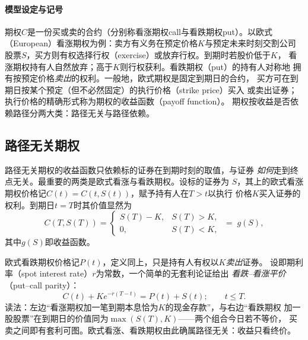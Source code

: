 \paragraph{模型设定与记号}
期权$C$是一份买或卖的合约（分别称看涨期权call与看跌期权put）。以欧式
（European）看涨期权为例：卖方有义务在预定价格$K$与预定未来时刻交割公司
股票$S$，买方则有权选择行权（exercise）或放弃行权。到期时若股价低于$K$，
看涨期权持有人自然放弃；高于$K$则行权获利。看跌期权（put）的持有人对称地
拥有按预定价格\emph{卖出}的权利。一般地，欧式期权是固定到期日的合约，
买方可在到期日按某个预定（但不必然固定）的执行价格（strike price）买入
或卖出证券；执行价格的精确形式称为期权的收益函数（payoff function）。
期权按收益是否依赖路径分两大类：路径无关与路径依赖。

\subsection{路径无关期权}

路径无关期权的收益函数只依赖标的证券在到期时刻的取值，与证券
\emph{如何}走到终点无关。最重要的两类是欧式看涨与看跌期权。设标的证券为
$S$，其上的欧式看涨期权价格记$C(t)=C(t,S(t))$，赋予持有人在$T>t$以执行
价格$K$买入证券的权利。到期日$t=T$时其价值显然为
\begin{equation*}
C(T,S(T))=
\begin{cases}
S(T)-K, & S(T)>K,\\[2pt]
0, & S(T)<K,
\end{cases}
\;=\;g(S),
\end{equation*}
其中$g(S)$即收益函数。


欧式看跌期权价格记$P(t)$，定义同上，只是持有人有权以$K$\emph{卖出}证券。
设即期利率（spot interest rate）$r$为常数，一个简单的无套利论证给出
\emph{看跌--看涨平价}（put--call parity）：
\begin{equation*}
C(t)+Ke^{-r(T-t)}=P(t)+S(t);\qquad t\leq T.
\end{equation*}
读法：左边“看涨期权加一笔到期本息恰为$K$的现金存款”，与右边“看跌期权
加一股股票”在到期日的价值同为$\max(S(T),K)$——两个组合今日若不等价，
买卖之间即有套利可图。欧式看涨、看跌期权由此确属路径无关：收益只看终价。



